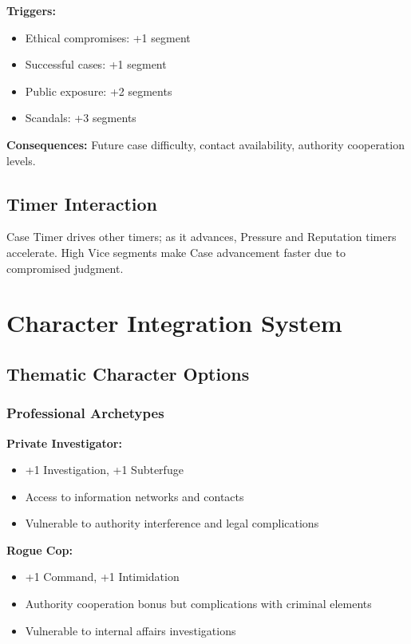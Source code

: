 \documentclass[11pt]{article}
\begin{document}
\textbf{Triggers:}
\begin{itemize}
\item Ethical compromises: +1 segment
\item Successful cases: +1 segment
\item Public exposure: +2 segments
\item Scandals: +3 segments
\end{itemize}

\textbf{Consequences:} Future case difficulty, contact availability, authority cooperation levels.

\subsection{Timer Interaction}

Case Timer drives other timers; as it advances, Pressure and Reputation timers accelerate. High Vice segments make Case advancement faster due to compromised judgment.

\section{Character Integration System}

\subsection{Thematic Character Options}

\subsubsection{Professional Archetypes}

\textbf{Private Investigator:}
\begin{itemize}
\item +1 Investigation, +1 Subterfuge
\item Access to information networks and contacts
\item Vulnerable to authority interference and legal complications
\end{itemize}

\textbf{Rogue Cop:}
\begin{itemize}
\item +1 Command, +1 Intimidation
\item Authority cooperation bonus but complications with criminal elements
\item Vulnerable to internal affairs investigations
\end{itemize}
\end{document}
